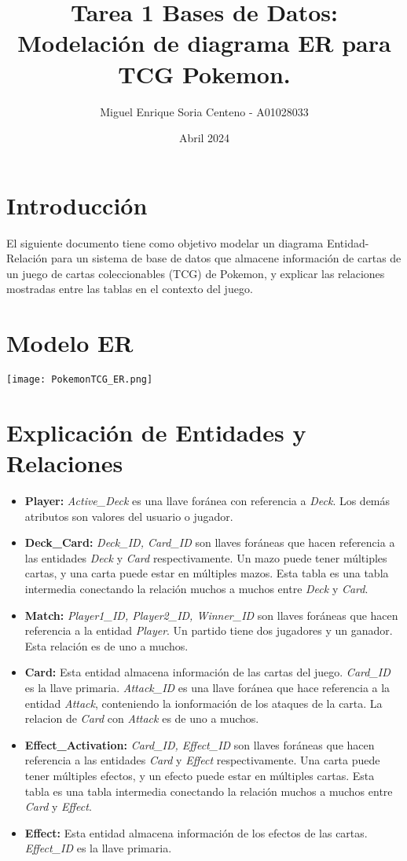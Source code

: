 \documentclass{article}
\title{Tarea 1 Bases de Datos: Modelación de diagrama ER para TCG Pokemon.}
\author{Miguel Enrique Soria Centeno - A01028033}
\date{Abril 2024}
\begin{document}
\maketitle

\section{Introducción}
El siguiente documento tiene como objetivo modelar un diagrama Entidad-Relación para un sistema de base de datos que almacene información de cartas de un juego de cartas coleccionables (TCG) de Pokemon, y explicar las relaciones mostradas entre las tablas en el contexto del juego. 

\section{Modelo ER}
\begin{center}
  \texttt{[image: PokemonTCG\_ER.png]}
\end{center}

\section{Explicación de Entidades y Relaciones}

\begin{itemize}
  \item \textbf{Player:} \textit{Active\_Deck} es una llave foránea con referencia a \textit{Deck}. Los demás atributos son valores del usuario o jugador. 
  \item \textbf{Deck\_Card:} \textit{Deck\_ID, Card\_ID} son llaves foráneas que hacen referencia a las entidades \textit{Deck} y \textit{Card} respectivamente. Un mazo puede tener múltiples cartas, y una carta puede estar en múltiples mazos. Esta tabla es una tabla intermedia conectando la relación muchos a muchos entre \textit{Deck} y \textit{Card}. 
  \item \textbf{Match:} \textit{Player1\_ID, Player2\_ID, Winner\_ID} son llaves foráneas que hacen referencia a la entidad \textit{Player}. Un partido tiene dos jugadores y un ganador. Esta relaci\'on es de uno a muchos. 
  \item \textbf{Card:} Esta entidad almacena informaci\'on de las cartas del juego. \textit{Card\_ID} es la llave primaria. \textit{Attack\_ID} es una llave foránea que hace referencia a la entidad \textit{Attack}, conteniendo la ionformaci\'on de los ataques de la carta. La relacion de \textit{Card} con \textit{Attack} es de uno a muchos. 
  \item \textbf{Effect\_Activation:} \textit{Card\_ID, Effect\_ID} son llaves foráneas que hacen referencia a las entidades \textit{Card} y \textit{Effect} respectivamente. Una carta puede tener múltiples efectos, y un efecto puede estar en múltiples cartas. Esta tabla es una tabla intermedia conectando la relación muchos a muchos entre \textit{Card} y \textit{Effect}. 
  \item \textbf{Effect:} Esta entidad almacena informaci\'on de los efectos de las cartas. \textit{Effect\_ID} es la llave primaria.

\end{itemize}
\end{document}
